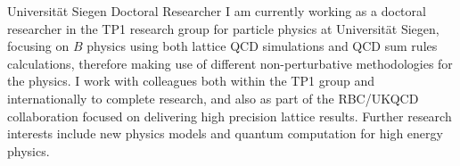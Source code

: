 \documentclass[10pt]{article} %
\begin{document}
\begin{paracol}{2}



\workposition{[03.21 -- present]}
{}
{Universit\"{a}t Siegen}
{Doctoral Researcher}
{I am currently working as a doctoral researcher in the TP1 research group for particle physics at Universit\"{a}t Siegen, focusing on $B$ physics using both lattice QCD simulations and QCD sum rules calculations, therefore making use of different non-perturbative methodologies for the physics. 
    I work with colleagues both within the TP1 group and internationally to complete research, and also as part of the RBC/UKQCD collaboration focused on delivering high precision lattice results. 
Further research interests include new physics models and quantum computation for high energy physics.}





\end{paracol}
\end{document}
